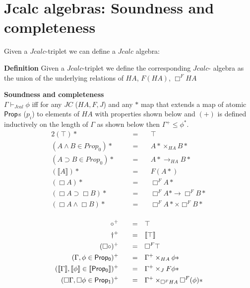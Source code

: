 \section{ Jcalc algebras: Soundness and completeness}
Given a $Jcalc$-triplet we can define a $Jcalc$ algebra:
\begin{mdframed}
    \textbf{Definition}
    Given a $Jcalc$-triplet we define the corresponding $Jcalc$-
     algebra as the union of the underlying relations
    of   $HA$, $F(HA)$, $\Box^{F}HA$
\end{mdframed}
    \begin{theorem}\label{thm:cmpjtriplet}
        \textbf{Soundness and completeness}\\
    $\Gamma\vdash_{Jcal}\phi$ iff for any   $JC$ ($HA,F,J$)
    and any $*$ map that extends  a map of atomic $\prop$s ($p_i$) to elements of $HA$ 
    with properties shown below and $(+)$ 
    is defined inductively on the length of $\Gamma$ as shown below
    then $\Gamma^+\leq\phi^{*}$.
    \begin{alignat*}{2}
        (\top)* &&\quad= & \quad\top\\
        (A\wedge B \in Prop_0)*  &&\quad = & \quad  A*\times_{HA}B*\\
        (A\supset B \in Prop_0)*  &&\quad = & \quad A*\rightarrow_{HA} B*\\
        (\llbracket A\rrbracket)* && \quad = & \quad F(A*)\\					
        (\Box A)* &&\quad = & \quad\Box^F A* \\
        (\Box A\supset \Box B)*  &&\quad = & \quad\Box^F A* \rightarrow{\Box^F B*}\\
        (\Box A\wedge\Box B)*  &&\quad = & \quad\Box^F A*\times{\Box^F B*}\\
    \end{alignat*}
    
    \begin{alignat*}{2}
      \circ^+  &&\quad = & \quad\top\\
      \dagger^+ &&\quad = & \quad\llbracket\top\rrbracket\\
      (\Box\circ)^+ &&\quad = & \quad\Box^F \top\\
      (\Gamma,\phi\in \sf {Prop_0})^+&&\quad = &\quad
      \Gamma^+\times_{HA}\phi* \\
      (\llbracket \Gamma\rrbracket,\llbracket\phi\rrbracket \in {\sf \llbracket Prop_0\rrbracket})^+&&\quad = &\quad
      \Gamma^+\times_{J}F\phi*\\
      (\Box\Gamma, \Box\phi \in {\sf Prop_1})^+&&\quad = &\quad
      \Gamma^+\times_{\Box^{F}HA}\Box^F (\phi)*\\
    \end{alignat*}
    \end{theorem}
